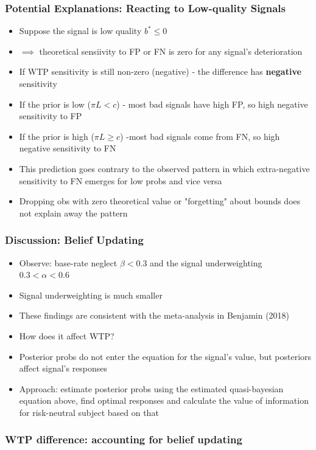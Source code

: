 \documentclass[11pt,hyperref={bookmarks=false}]{beamer}
\begin{document}
\begin{frame}
\frametitle{Potential Explanations: Reacting to Low-quality Signals}
\begin{itemize}
\item Suppose the signal is low quality $b^*\leq 0$
\item $\implies$ theoretical sensiivity to FP or FN is zero for any signal's deterioration
\item If WTP sensitivity is still non-zero (negative) - the difference has \textbf{negative} sensitivity
\item If the prior is low ($\pi L<c$) - most bad signals have high FP, so high negative sensitivity to FP
\item If the prior is high ($\pi L\geq c$) -most bad signals come from FN, so high negative sensitivity to FN
\item This prediction goes contrary to the observed pattern in which extra-negative sensitivity to FN emerges for low probs and vice versa 
\item Dropping obs with zero theoretical value or "forgetting" about bounds does not explain away the pattern
\end{itemize}
\end{frame}



\begin{frame}
\frametitle{Discussion: Belief Updating}
\begin{itemize}
\item Observe: base-rate neglect $\beta<0.3$ and the signal underweighting $0.3<\alpha<0.6$
\item Signal underweighting is much smaller
\item These findings are consistent with the meta-analysis in Benjamin (2018)
\item How does it affect WTP? 
\item Posterior probs do not enter the equation for the signal's value, but posteriors affect signal's responses
\item Approach: estimate posterior probs using the estimated quasi-bayesian equation above, find optimal responses and calculate the value of information for risk-neutral subject based on that
\end{itemize}
\end{frame}

\begin{frame}
\frametitle{WTP difference: accounting for belief updating}
\footnotesize

\end{frame}
\end{document}
